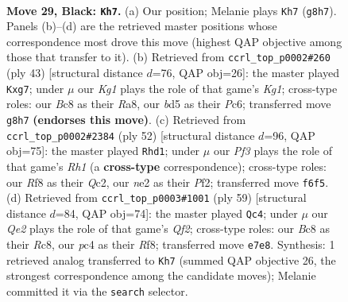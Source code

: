 \documentclass[11pt]{article}
\begin{document}
\clearpage

\begin{figure}[p]\centering
\begin{subfigure}{0.46\textwidth}\centering
\resizebox{\linewidth}{!}{%
\newchessgame
\chessboard[
  setfen={2b2rk1/p3q1b1/Pr1pPp1B/2pB4/2P3Q1/6P1/4N2K/R4R2 b - - 2 29},
  showmover=false,
  pgfstyle=straightmove, color=movearrow, markmove={g8-h7}
]}
\caption{}
\end{subfigure}\hfill
\begin{subfigure}{0.46\textwidth}\centering
\resizebox{\linewidth}{!}{%
\newchessgame
\chessboard[
  setfen={r3r1k1/1p2qpBp/2ppb1p1/8/2P1R3/1Q4PP/PP3PB1/R5K1 b - - 0 22},
  showmover=false,
  pgfstyle=straightmove, color=movearrow, markmove={g8-g7}
]}
\caption{}
\end{subfigure}
\\[4pt]
\begin{subfigure}{0.46\textwidth}\centering
\resizebox{\linewidth}{!}{%
\newchessgame
\chessboard[
  setfen={k4r1r/1p4p1/pq3n2/2b2B2/2PB2p1/P2R3p/1PQ2P1P/1K5R w - - 1 27},
  showmover=false,
  pgfstyle=straightmove, color=movearrow, markmove={h1-d1}
]}
\caption{}
\end{subfigure}\hfill
\begin{subfigure}{0.46\textwidth}\centering
\resizebox{\linewidth}{!}{%
\newchessgame
\chessboard[
  setfen={2r2r1k/5q1p/R1p2bpP/5nB1/3p1PB1/8/P2Q2P1/5RK1 b - - 2 30},
  showmover=false,
  pgfstyle=straightmove, color=movearrow, markmove={f7-c4}
]}
\caption{}
\end{subfigure}
\caption{\textbf{Move 29, Black: \texttt{Kh7}.} (a) Our position; Melanie plays \texttt{Kh7} (\texttt{g8h7}). Panels (b)--(d) are the retrieved master positions whose correspondence most drove this move (highest QAP objective among those that transfer to it). (b) Retrieved from \texttt{ccrl\_top\_p0002\#260} (ply 43) [structural distance $d$=76, QAP obj=26]: the master played \texttt{Kxg7}; under $\mu$ our \emph{Kg1} plays the role of that game's \emph{Kg1}; cross-type roles: our \emph{B}c8 as their \emph{R}a8, our \emph{b}d5 as their \emph{P}c6; transferred move \texttt{g8h7} \textbf{(endorses this move)}. (c) Retrieved from \texttt{ccrl\_top\_p0002\#2384} (ply 52) [structural distance $d$=96, QAP obj=75]: the master played \texttt{Rhd1}; under $\mu$ our \emph{Pf3} plays the role of that game's \emph{Rh1} (a \textbf{cross-type} correspondence); cross-type roles: our \emph{R}f8 as their \emph{Q}c2, our \emph{n}e2 as their \emph{P}f2; transferred move \texttt{f6f5}. (d) Retrieved from \texttt{ccrl\_top\_p0003\#1001} (ply 59) [structural distance $d$=84, QAP obj=74]: the master played \texttt{Qc4}; under $\mu$ our \emph{Qe2} plays the role of that game's \emph{Qf2}; cross-type roles: our \emph{B}c8 as their \emph{R}c8, our \emph{p}c4 as their \emph{R}f8; transferred move \texttt{e7e8}. Synthesis: 1 retrieved analog transferred to \texttt{Kh7} (summed QAP objective 26, the strongest correspondence among the candidate moves); Melanie committed it via the \texttt{search} selector.}
\label{fig:thought-m57}
\end{figure}
\end{document}
